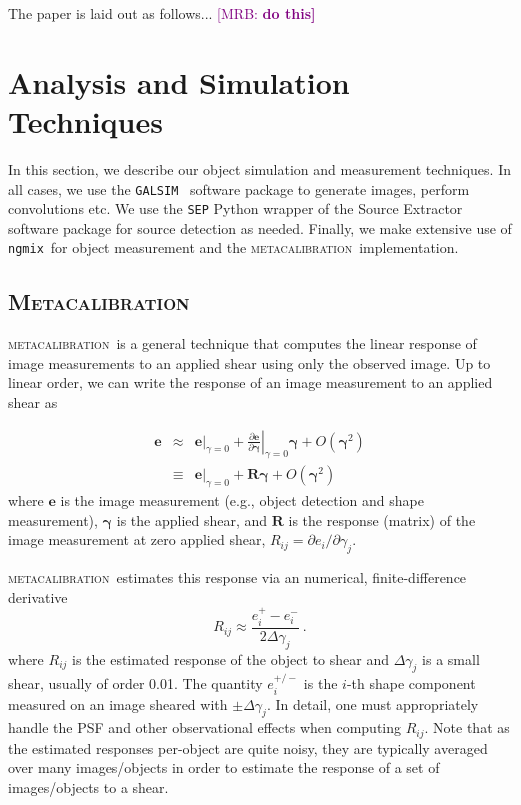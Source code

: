 \documentclass[fleqn,useAMS,usenatbib]{mnras}
\newcommand{\mrb}[1]{\textcolor{purple}{[MRB: \bf #1]}}
\newcommand{\galsim}{\texttt{GALSIM}}
\newcommand{\ngmix}{\texttt{ngmix}}
\newcommand{\mcal}{\textsc{metacalibration}}
\begin{document}
The paper is laid out as follows... \mrb{do this}

\section{Analysis and Simulation Techniques}
\label{sec:sims}

In this section, we describe our object simulation and measurement techniques.
In all cases, we use the \galsim\ \citep{GALSIM2015} software package to
generate images, perform convolutions etc. We use the \texttt{SEP} \citep{sep}
Python wrapper of the Source Extractor software package \citep{Bertin96} for
source detection as needed. Finally, we make extensive use of \ngmix\ for object
measurement and the \mcal\ implementation.

\subsection{\textsc{Metacalibration}}

\mcal\ is a general technique that computes the linear response of image
measurements to an applied shear using only the observed image. Up to linear
order, we can write the response of an image measurement to an applied shear as

\begin{eqnarray}
\boldsymbol{e} & \approx & \left.\boldsymbol{e}\right|_{\gamma=0} +
                           \left.\frac{\partial \boldsymbol{e}}{\partial\boldsymbol\gamma}\right|_{\gamma=0} \boldsymbol\gamma +
                           O(\boldsymbol\gamma^2)\nonumber\\
               & \equiv  & \left.\boldsymbol{e}\right|_{\gamma=0} +
                           \boldsymbol{R} \boldsymbol\gamma +
                           O(\boldsymbol\gamma^2)
\end{eqnarray}
where $\boldsymbol{e}$ is the image measurement (e.g., object detection and shape
measurement), $\boldsymbol\gamma$ is the applied shear, and $\boldsymbol{R}$ is
the response (matrix) of the image measurement at zero applied shear,
$R_{ij}=\partial e_i /\partial \gamma_j$.

\mcal\ estimates this response via an numerical, finite-difference derivative
\begin{displaymath}
R_{ij} \approx \frac{e_i^{+} - e_i^{-}}{2\Delta\gamma_j}\ .
\end{displaymath}
where $R_{ij}$ is the estimated response of the object to shear
and $\Delta\gamma_j$ is a small shear, usually of order 0.01. The quantity
$e_i^{+/-}$ is the $i$-th shape component measured on an image sheared with
$\pm\Delta\gamma_j$. In detail, one must appropriately handle the PSF and
other observational effects when computing $R_{ij}$. Note that as the
estimated responses per-object are quite noisy, they are typically averaged
over many images/objects in order to estimate the response of a set of
images/objects to a shear.
\end{document}
